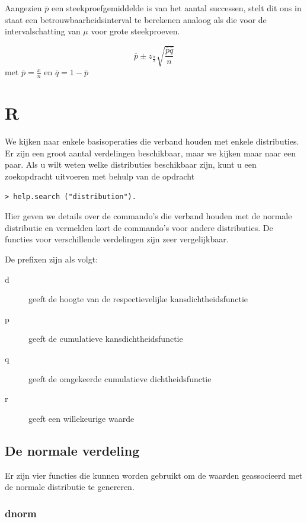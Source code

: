 {Aangezien $\overline{p}$ een steekproefgemiddelde is van het aantal successen, stelt dit ons in staat een betrouwbaarheidsinterval te berekenen analoog als die voor de intervalschatting van $\mu$ voor grote steekproeven.

\begin{definition}
  \[ \overline{p} \pm z_{\frac{\alpha}{2}} \sqrt{\frac{\overline{p}\overline{q}}{n}} \]
  met $\overline{p} = \frac{x}{n}$ en $\overline{q} = 1- \overline{p}$
\end{definition}


\section{R}
We kijken naar enkele basisoperaties die verband houden met enkele distributies. Er zijn een groot aantal verdelingen beschikbaar, maar we kijken maar naar een paar. Als u wilt weten welke distributies beschikbaar zijn, kunt u een zoekopdracht uitvoeren met behulp van de opdracht

\begin{lstlisting}
> help.search ("distribution").
\end{lstlisting}


Hier geven we details over de commando's die verband houden met de normale distributie en vermelden kort de commando's voor andere distributies. De functies voor verschillende verdelingen zijn zeer vergelijkbaar.

De prefixen zijn als volgt:
\begin{description}
	\item[d] geeft de hoogte van de respectievelijke kansdichtheidsfunctie
	\item[p] geeft de cumulatieve kansdichtheidsfunctie
	\item[q] geeft de omgekeerde cumulatieve dichtheidsfunctie
	\item[r] geeft een willekeurige waarde
\end{description}

\subsection{De normale verdeling}
Er zijn vier functies die kunnen worden gebruikt om de waarden geassocieerd met de normale distributie te genereren.
\subsubsection{dnorm}

}
